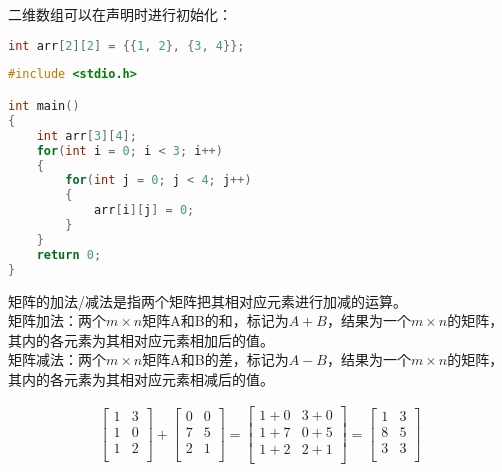 二维数组可以在声明时进行初始化：

\vspace{-0.5cm}

\begin{lstlisting}[language=C]
int arr[2][2] = {{1, 2}, {3, 4}};
\end{lstlisting}

\vspace{0.5cm}


\begin{lstlisting}[language=C]
#include <stdio.h>

int main()
{
	int arr[3][4];
	for(int i = 0; i < 3; i++)
	{
		for(int j = 0; j < 4; j++)
		{
			arr[i][j] = 0;
		}
	}
	return 0;
}
\end{lstlisting}

\vspace{0.5cm}


\vspace{0.5cm}

矩阵的加法/减法是指两个矩阵把其相对应元素进行加减的运算。\\

矩阵加法：两个$ m \times n $矩阵A和B的和，标记为$ A + B $，结果为一个$ m \times n $的矩阵，其内的各元素为其相对应元素相加后的值。\\

矩阵减法：两个$ m \times n $矩阵A和B的差，标记为$ A - B $，结果为一个$ m \times n $的矩阵，其内的各元素为其相对应元素相减后的值。

\begin{align}\nonumber
	\left[\begin{matrix}
			1 & 3 \\
			1 & 0 \\
			1 & 2 \\
		\end{matrix} \right]
	+
	\left[\begin{matrix}
			0 & 0 \\
			7 & 5 \\
			2 & 1 \\
		\end{matrix} \right]
	=
	\left[\begin{matrix}
			1+0 & 3+0 \\
			1+7 & 0+5 \\
			1+2 & 2+1 \\
		\end{matrix} \right]
	=
	\left[\begin{matrix}
			1 & 3 \\
			8 & 5 \\
			3 & 3 \\
		\end{matrix} \right]
\end{align}

